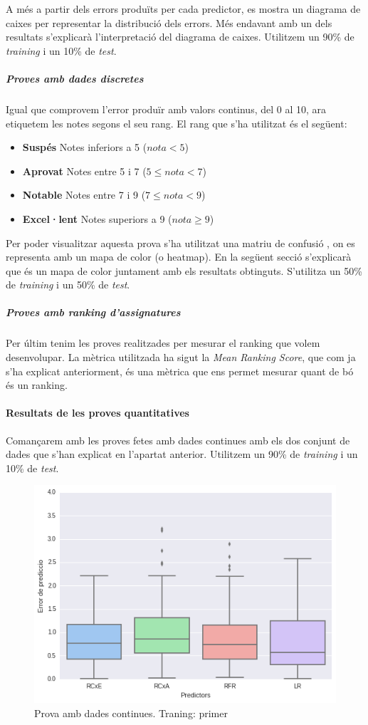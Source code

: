 \documentclass[12pt,a4paper,catalan]{article}
\begin{document}
A més a partir dels errors produïts per cada predictor, es mostra un diagrama de caixes \cite{boxplot} per representar la distribució dels errors. Més endavant amb un dels resultats s'explicarà l'interpretació del diagrama de caixes. Utilitzem un 90\% de \textit{training} i un 10\% de \textit{test}.


\subparagraph{Proves amb dades discretes}
Igual que comprovem l'error produïr amb valors continus, del 0 al 10, ara etiquetem les notes segons el seu rang. El rang que s'ha utilitzat és el següent:

\begin{itemize}[leftmargin=.5in]
	\item \textbf{Suspés} Notes inferiors a 5 ($nota < 5$)
	\item \textbf{Aprovat} Notes entre 5 i 7 ($5 \leq nota < 7 $)
	\item \textbf{Notable} Notes entre 7 i 9 ($7 \leq nota < 9 $)
	\item \textbf{Excel·lent} Notes superiors a 9 ($nota \geq 9$)
\end{itemize}

Per poder visualitzar aquesta prova s'ha utilitzat una matriu de confusió \cite{confusionmatrix}, on es representa amb un mapa de color (o heatmap). En la següent secció s'explicarà que és un mapa de color juntament amb els resultats obtinguts. S'utilitza un 50\% de \textit{training} i un 50\% de \textit{test}.

\subparagraph{Proves amb ranking d'assignatures}
Per últim tenim les proves realitzades per mesurar el ranking que volem desenvolupar. La mètrica utilitzada ha sigut la \textit{Mean Ranking Score}, que com ja s'ha explicat anteriorment, és una mètrica que ens permet mesurar quant de bó és un ranking.

\paragraph{Resultats de les proves quantitatives}
Comançarem amb les proves fetes amb dades continues amb els dos conjunt de dades que s'han explicat en l'apartat anterior.  Utilitzem un 90\% de \textit{training} i un 10\% de \textit{test}.

\begin{figure}[h]
\centering
\includegraphics[width=.7\linewidth]{img/boxplot_primer_segon.png}
\caption{Prova amb dades continues. Traning: primer}
\end{figure}
\end{document}
